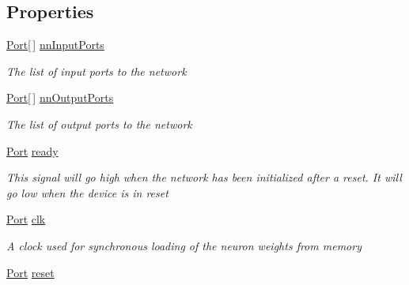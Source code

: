 \subsection*{Properties}
\begin{DoxyCompactItemize}
\item 
\hyperlink{class_n_n_gen_1_1_port}{Port}\mbox{[}$\,$\mbox{]} \hyperlink{class_n_n_gen_1_1_sync_neural_network_a6d72194820925ead7f84387e53390f9d}{nn\+Input\+Ports}
\begin{DoxyCompactList}\small\item\em The list of input ports to the network \end{DoxyCompactList}\item 
\hyperlink{class_n_n_gen_1_1_port}{Port}\mbox{[}$\,$\mbox{]} \hyperlink{class_n_n_gen_1_1_sync_neural_network_a9e0690fdd6bd2ee365d76b2b9d3ad593}{nn\+Output\+Ports}
\begin{DoxyCompactList}\small\item\em The list of output ports to the network \end{DoxyCompactList}\item 
\hyperlink{class_n_n_gen_1_1_port}{Port} \hyperlink{class_n_n_gen_1_1_sync_neural_network_a6306a2d9e689ed32c74ccc5222284315}{ready}
\begin{DoxyCompactList}\small\item\em This signal will go high when the network has been initialized after a reset. It will go low when the device is in reset \end{DoxyCompactList}\item 
\hyperlink{class_n_n_gen_1_1_port}{Port} \hyperlink{class_n_n_gen_1_1_sync_neural_network_ab3381bb9b85c8a08ff4f31a123c9c246}{clk}
\begin{DoxyCompactList}\small\item\em A clock used for synchronous loading of the neuron weights from memory \end{DoxyCompactList}\item 
\hyperlink{class_n_n_gen_1_1_port}{Port} \hyperlink{class_n_n_gen_1_1_sync_neural_network_a6479fe503fb64dead6508c80c773b042}{reset}

\end{DoxyCompactItemize}
